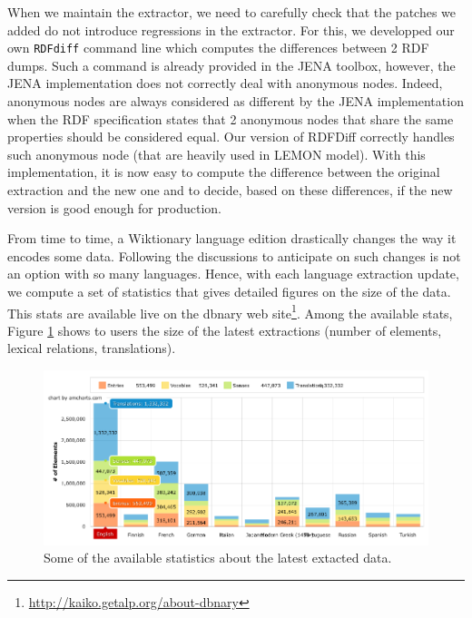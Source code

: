 \documentclass[10pt, a4paper]{article}
\begin{document}
When we maintain the extractor, we need to carefully check that the patches we added do not introduce regressions in the extractor. For this, we developped our own \texttt{RDFdiff} command line which computes the differences between 2 RDF dumps. Such a command is already provided in the JENA toolbox, however, the JENA implementation does not correctly deal with anonymous nodes. Indeed, anonymous nodes are always considered as different by the JENA implementation when the RDF specification states that 2 anonymous nodes that share the same properties should be considered equal. Our version of RDFDiff correctly handles such anonymous node (that are heavily used in LEMON model). With this implementation, it is now easy to compute the difference between the original extraction and the new one and to decide, based on these differences, if the new version is good enough for production.

From time to time, a Wiktionary language edition drastically changes the way it encodes some data. Following the discussions to anticipate on such changes is not an option with so many languages. Hence, with each language extraction update, we compute a set of statistics that gives detailed figures on the size of the data. This stats are available live on the dbnary web site\footnote{\url{http://kaiko.getalp.org/about-dbnary}}. Among the available stats, Figure \ref{fig:figure1} shows to users the size of the latest extractions (number of elements, lexical relations, translations). 

\begin{figure}[htb]
	\begin{center}
		\includegraphics[width=\textwidth]{latest.png}
	\end{center}
	\caption{Some of the available statistics about the latest extacted data.}
	\label{fig:figure1}
\end{figure}
\end{document}
